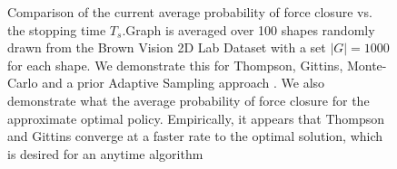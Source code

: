 \documentclass[10pt, conference]{ieeeconf}      %
\begin{document}
  
   

\begin{figure}%
    \centering

    \caption{Comparison of the current average probability of force closure vs. the stopping time $T_s$.Graph is averaged over 100 shapes randomly drawn from the Brown Vision 2D Lab Dataset \cite{brown} with a set $|G|=1000$ for each shape.  We demonstrate this for Thompson, Gittins, Monte-Carlo and a prior Adaptive Sampling approach \cite{kehoe2012toward}. We also demonstrate what the average probability of force closure for the approximate optimal policy. Empirically, it appears that Thompson and Gittins converge at a faster rate to the optimal solution, which is desired for an anytime algorithm  }%
    \label{fig:motivation}%
\end{figure}
\end{document}
